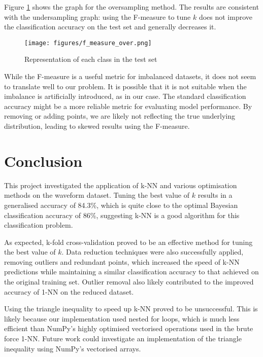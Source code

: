 \documentclass{article}
\theoremstyle{plain}
\theoremstyle{definition}
\theoremstyle{remark}
\begin{document}
        Figure \ref{fig:f_over} shows the graph for the oversampling method. The results are consistent with the undersampling graph: using the F-measure to tune $k$ does not improve the classification accuracy on the test set and generally decreases it.

        \begin{figure}[h]
            \centering
            \begin{minipage}[t]{0.8\linewidth}
                \centering
                \texttt{[image: figures/f\_measure\_over.png]}
                \caption{Representation of each class in the test set}
                \label{fig:f_over}
            \end{minipage}%
        \end{figure}

        While the F-measure is a useful metric for imbalanced datasets, it does not seem to translate well to our problem. It is possible that it is not suitable when the imbalance is artificially introduced, as in our case. The standard classification accuracy might be a more reliable metric for evaluating model performance. By removing or adding points, we are likely not reflecting the true underlying distribution, leading to skewed results using the F-measure.


\section{Conclusion}
    This project investigated the application of k-NN and various optimisation methods on the waveform dataset. Tuning the best value of $k$ results in a generalised accuracy of 84.3\%, which is quite close to the optimal Bayesian classification accuracy of 86\%, suggesting k-NN is a good algorithm for this classification problem.

    As expected, k-fold cross-validation proved to be an effective method for tuning the best value of $k$. Data reduction techniques were also successfully applied, removing outliers and redundant points, which increased the speed of k-NN predictions while maintaining a similar classification accuracy to that achieved on the original training set. Outlier removal also likely contributed to the improved accuracy of 1-NN on the reduced dataset.

    Using the triangle inequality to speed up k-NN proved to be unsuccessful. This is likely because our implementation used nested for loops, which is much less efficient than NumPy's highly optimised vectorised operations used in the brute force 1-NN. Future work could investigate an implementation of the triangle inequality using NumPy's vectorised arrays.
\end{document}
